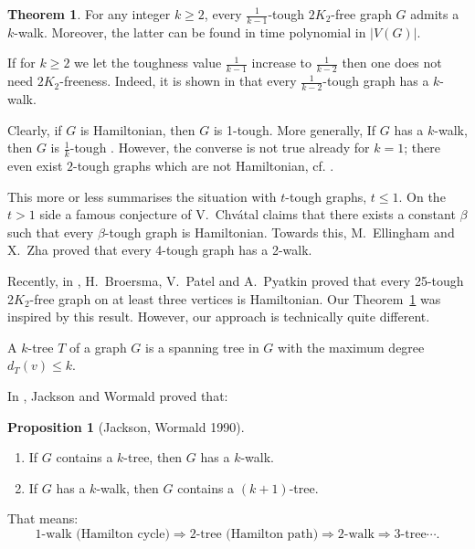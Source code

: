 \documentclass{amsart}
\theoremstyle{definition}
\newtheorem{theorem}{Theorem}
\newtheorem{proposition}{Proposition}
\begin{document}
\begin{theorem}\label{thm2} 
For any integer $k\ge2$, every $\frac{1}{k-1}$-tough $2K_2$-free graph $G$
admits a $k$-walk.
Moreover, the latter can be found in time polynomial in $|V(G)|$.
\end{theorem}

If for $k\geq 2$ we let the toughness value $\frac{1}{k-1}$ increase to
$\frac{1}{k-2}$ then
one does not need $2K_2$-freeness. Indeed, it is shown in
\cite{jackson1990k} that
every $\frac{1}{k-2}$-tough graph has a $k$-walk.

Clearly, if $G$ is
Hamiltonian, then $G$ is 1-tough.  More generally,
If $G$ has a $k$-walk, then $G$ is $\frac{1}{k}$-tough \cite{jackson1990k}.
However, the converse is not true already for $k=1$; there even exist $2$-tough graphs which are
not Hamiltonian, cf. \cite{bauer2000not}.

This more or less summarises the situation with $t$-tough graphs, $t\leq 1$.
On the $t>1$ side 
a famous conjecture of V.~Chv\'{a}tal \cite{chvatal1973tough} claims
that there exists a constant $\beta$ such that every
$\beta$-tough graph is Hamiltonian.  
Towards this, 
M.~Ellingham and X.~Zha \cite{ellingham2000toughness} proved that
every 4-tough graph has a 2-walk.

Recently, in \cite{broersma2014toughness}, H.~Broersma, V.~Patel and A.~Pyatkin proved that 
every 25-tough 2$K_2$-free graph on at least three vertices is Hamiltonian.
Our Theorem~\ref{thm2} was inspired by this result.  
However, our approach is technically quite different. 


A $k$-tree $T$ of a graph $G$ is a spanning tree in $G$ with the maximum degree $d_T(v)\le k$.

In \cite{jackson1990k}, Jackson and Wormald proved that:
\begin{proposition}[Jackson, Wormald 1990]
~
\begin{enumerate}
\item If $G$ contains a $k$-tree, then $G$ has a $k$-walk.
\item If $G$ has a $k$-walk, then $G$ contains a $(k+1)$-tree.
\end{enumerate}
\end{proposition}
That means:$$\text{1-walk (Hamilton cycle)}\Rightarrow\text{2-tree (Hamilton path)}\Rightarrow\text{2-walk}\Rightarrow\text{3-tree}\cdots.$$
\end{document}

